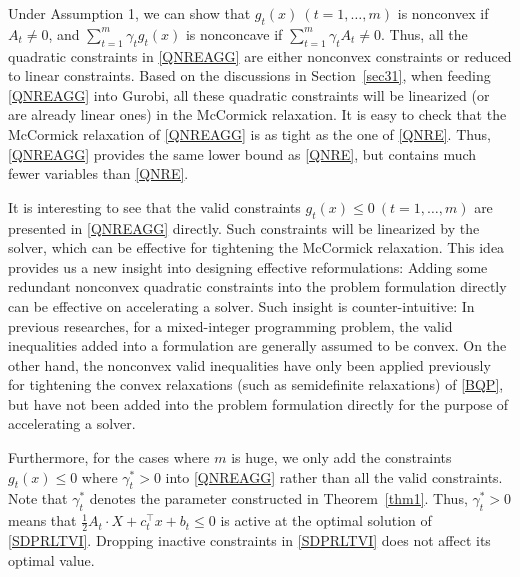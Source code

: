 \documentclass[pdflatex,sn-mathphys-num]{sn-jnl}%
\theoremstyle{thmstyleone}%
\theoremstyle{thmstyletwo}%
\theoremstyle{thmstylethree}%
\begin{document}
Under Assumption 1, we can show that $g_t(x)~(t=1,\ldots,m)$ is nonconvex if $A_t\neq 0$, and $\sum_{t=1}^m \gamma_t g_t(x)$ is nonconcave if $\sum_{t=1}^m \gamma_t A_t\neq 0$. Thus, all the quadratic constraints in \eqref{QNREAGG} are either nonconvex constraints or reduced to linear constraints. Based on the discussions in Section~\ref{sec31}, when feeding \eqref{QNREAGG} into Gurobi, all these quadratic constraints will be linearized (or are already linear ones) in the McCormick relaxation. It is easy to check that the McCormick relaxation of \eqref{QNREAGG} is as tight as the one of \eqref{QNRE}. Thus, \eqref{QNREAGG} provides the same lower bound as \eqref{QNRE}, but contains much fewer variables than \eqref{QNRE}.

It is interesting to see that the valid constraints $g_t(x)\leq 0 ~(t=1,\ldots,m)$ are presented in \eqref{QNREAGG} directly. Such constraints will be linearized by the solver, which can be effective for tightening the McCormick relaxation. This idea provides us a new insight into designing effective reformulations: Adding some redundant nonconvex quadratic constraints into the problem formulation directly can be effective on accelerating a solver. Such insight is counter-intuitive: In previous researches, for a mixed-integer programming problem, the valid inequalities added into a formulation are generally assumed to be convex. On the other hand, the nonconvex valid inequalities have only been applied previously for tightening the convex relaxations (such as semidefinite relaxations) of \eqref{BQP}, but have not been added into the problem formulation directly for the purpose of accelerating a solver.



Furthermore, for the cases where $m$ is huge, we only add the constraints $g_t(x)\leq 0$ where $\gamma^\ast_t>0$ into \eqref{QNREAGG} rather than all the valid constraints. Note that $\gamma_t^\ast$ denotes the parameter constructed in Theorem~\ref{thm1}. Thus, $\gamma^\ast_t>0$ means that $\frac{1}{2}A_t\cdot X+c_t^\top x+b_t\leq 0$ is active at the optimal solution of \eqref{SDPRLTVI}. Dropping inactive constraints in \eqref{SDPRLTVI} does not affect its optimal value.
\end{document}
